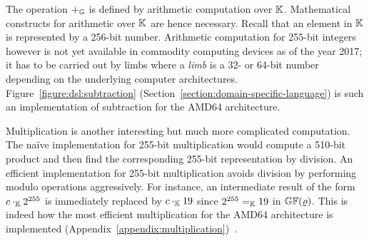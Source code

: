 
The operation $+_{\mathbb{G}}$ is defined by arithmetic computation over
$\mathbb{K}$. %
Mathematical constructs for
arithmetic over $\mathbb{K}$ are hence necessary. Recall that
an element in $\mathbb{K}$ is represented by a 256-bit number. 
Arithmetic computation for 255-bit integers however is not yet
available in commodity computing devices as of the year
2017; it has to be carried out by limbs where a
\emph{limb} is a 32- or 64-bit number depending on the underlying
computer architectures. Figure~\ref{figure:dsl:subtraction}
(Section~\ref{section:domain-specific-language}) is such an
implementation of subtraction for the AMD64 architecture. 



Multiplication is another interesting but much more
complicated computation. The na\"ive implementation for 255-bit
multiplication would compute a 510-bit product and then find the
corresponding 255-bit representation by division. 
An efficient implementation for 255-bit multiplication avoids
division by performing modulo operations aggressively. 
For instance, an intermediate
result of the form $c \cdot_{\mathbb{K}} 2^{255}$ is immediately replaced by
$c \cdot_{\mathbb{K}} 19$ since $2^{255} =_{\mathbb{K}} 19$ in $\mathbb{GF}(\varrho)$. 
This is indeed how the most efficient multiplication for the AMD64
architecture is implemented (Appendix~\ref{appendix:multiplication})~\cite{BDL+:11:HSHSS,BDL+:12:HSHSS}.


